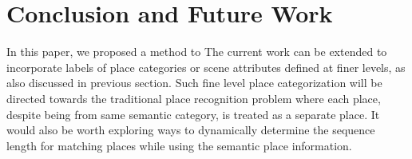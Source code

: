 \documentclass[letterpaper, 10 pt, conference]{ieeeconf}  %
\begin{document}


\section{Conclusion and Future Work}
In this paper, we proposed a method to 
The current work can be extended to incorporate labels of place categories or scene attributes defined at finer levels, as also discussed in previous section. Such fine level place categorization will be directed towards the traditional place recognition problem where each place, despite being from same semantic category, is treated as a separate place. It would also be worth exploring ways to dynamically determine the sequence length for matching places while using the semantic place information.



\end{document}

